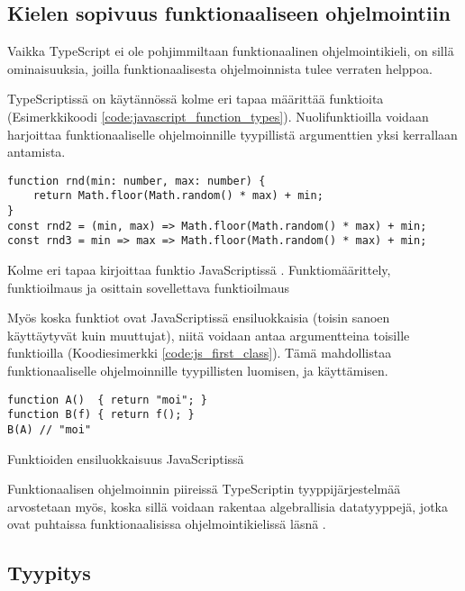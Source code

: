 \subsection{Kielen sopivuus funktionaaliseen ohjelmointiin}

Vaikka TypeScript ei ole pohjimmiltaan funktionaalinen ohjelmointikieli, on sillä ominaisuuksia, joilla funktionaalisesta ohjelmoinnista tulee verraten helppoa.

TypeScriptissä on käytännössä kolme eri tapaa määrittää funktioita (Esimerkkikoodi \ref{code:javascript_function_types}). Nuolifunktioilla voidaan harjoittaa funktionaaliselle ohjelmoinnille tyypillistä argumenttien yksi kerrallaan antamista.


\begin{code}
    \begin{verbatim}
function rnd(min: number, max: number) { 
	return Math.floor(Math.random() * max) + min;
}
const rnd2 = (min, max) => Math.floor(Math.random() * max) + min;
const rnd3 = min => max => Math.floor(Math.random() * max) + min;
\end{verbatim}
    \caption{Kolme eri tapaa kirjoittaa funktio JavaScriptissä \cite{okhravi-g-discussion}. Funktiomäärittely, funktioilmaus ja osittain sovellettava funktioilmaus}
    \label{code:javascript_function_types}
\end{code}

Myös koska funktiot ovat JavaScriptissä ensiluokkaisia (toisin sanoen käyttäytyvät kuin muuttujat), niitä voidaan antaa argumentteina toisille funktioilla (Koodiesimerkki \ref{code:js_first_class}). Tämä mahdollistaa funktionaaliselle ohjelmoinnille tyypillisten  luomisen, ja käyttämisen.

\begin{code}
    \begin{verbatim}
function A()  { return "moi"; }
function B(f) { return f(); }
B(A) // "moi"
\end{verbatim}
    \caption{Funktioiden ensiluokkaisuus JavaScriptissä}
    \label{code:js_first_class}
\end{code}

Funktionaalisen ohjelmoinnin piireissä TypeScriptin tyyppijärjestelmää arvostetaan myös, koska sillä voidaan rakentaa algebrallisia datatyyppejä, jotka ovat puhtaissa funktionaalisissa ohjelmointikielissä läsnä \cite{holvikari2021category}.


\subsection{Tyypitys}

